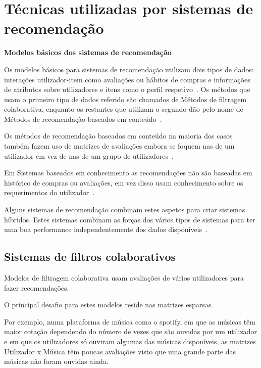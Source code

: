 \section{Técnicas utilizadas por sistemas de recomendação}

\begin{center}
\normalsize{\bfseries Modelos básicos dos sistemas de recomendação}\hfill
\end{center}


\par Os modelos básicos para sistemas de recomendação utilizam dois tipos de dados: interações utilizador-item como avaliações ou hábitos de compras e informações de atributos sobre utilizadores e itens como o perfil respetivo~\cite{ref_book1}. Os métodos que usam o primeiro tipo de dados referido são chamados de Métodos de filtragem colaborativa, enquanto os restantes que utilizam o segundo dão pelo nome de Métodos de recomendação baseados em conteúdo~\cite{ref_book1}.
\par Os métodos de recomendação baseados em conteúdo na maioria dos casos também fazem uso de matrizes de avaliações embora se foquem nas de um utilizador em vez de nas de um grupo de utilizadores~\cite{ref_book1}.
\par Em Sistemas baseados em conhecimento as recomendações não são baseadas em histórico de compras ou avaliações, em vez disso usam conhecimento sobre os requerimentos do utilizador~\cite{ref_book1}.
\par Alguns sistemas de recomendação combinam estes aspetos para criar sistemas híbridos. Estes sistemas combinam as forças dos vários tipos de sistemas para ter uma boa performance independentemente dos dados disponíveis~\cite{ref_book1}.
\hfill

\subsection{Sistemas de filtros colaborativos}

\hfill

\par Modelos de filtragem colaborativa usam avaliações de vários utilizadores para fazer recomendações.

\par O principal desafio para estes modelos reside nas matrizes esparsas.

\par Por exemplo, numa plataforma de música como o spotify, em que as músicas têm maior cotação dependendo do número de vezes que são ouvidas por um utilizador e em que os utilizadores só ouviram algumas das músicas disponíveis, as matrizes Utilizador x Música têm poucas avaliações visto que uma grande parte das músicas não foram ouvidas ainda.

